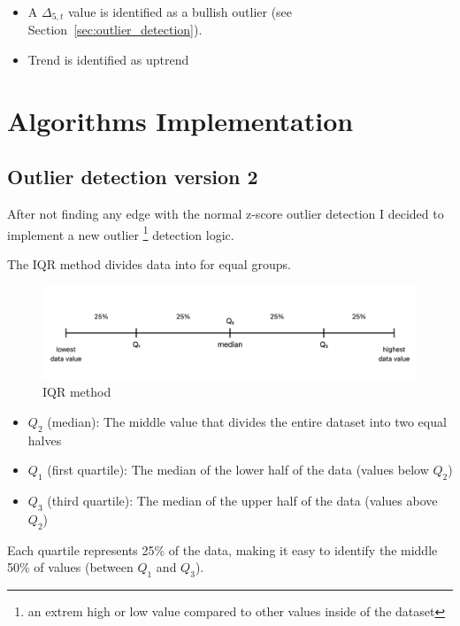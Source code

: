 \documentclass[12pt]{article}
\begin{document}
\begin{itemize}
  \item  A $\Delta_{5,t}$ value is identified as a bullish outlier (see Section~\ref{sec:outlier_detection}).
  \item Trend is identified as uptrend
\end{itemize}







\newpage
\section{Algorithms Implementation}


\subsection{Outlier detection version 2}
After not finding any edge with the normal z-score outlier detection I decided to implement a new outlier \footnote{an extrem high or low value compared to other values inside of the dataset} detection logic.




The IQR method divides data into for equal groups.  

\begin{figure}[H]
  \centering
  \includegraphics[width=\textwidth]{imgs/IQR-visualisation.png}
  \caption{IQR method}
  \label{fig:IQR_method}
\end{figure}



\begin{itemize}
  \item $Q_2$ (median): The middle value that divides the entire dataset into two equal halves
  \item $Q_1$ (first quartile): The median of the lower half of the data (values below $Q_2$)
  \item $Q_3$ (third quartile): The median of the upper half of the data (values above $Q_2$)
\end{itemize}

Each quartile represents 25\% of the data, making it easy to identify the middle 50\% of values (between $Q_1$ and $Q_3$).
\end{document}
